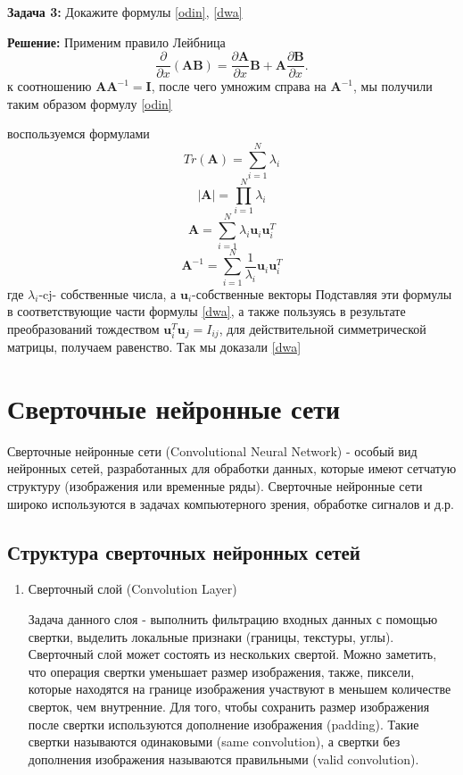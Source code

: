 {\textbf{Задача 3:}
Докажите формулы \ref{odin}, \ref{dwa} \

\textbf{Решение:}
Применим правило Лейбница
\[
\frac{\partial}{\partial x} (\mathbf{AB})=\frac{\partial \mathbf{A}}{\partial x}
 \mathbf{B}+\mathbf{A}\frac{\partial \mathbf{B}}{\partial x}.
\]
к соотношению $\mathbf{AA}^{-1}=\mathbf{I}$, после чего умножим справа на $\mathbf{A}^{-1}$, мы получили таким образом формулу \ref{odin}

воспользуемся формулами 
\[
Tr(\mathbf{A})=\displaystyle \sum_{i=1}^{N} \lambda_i
\]
\[
|\mathbf{A}|=\displaystyle \prod_{i=1}^{N} \lambda_i
\]
\[
\mathbf{A}=\displaystyle \sum_{i=1}^{N} \lambda_i \mathbf{u}_i\mathbf{u}_i^{T}
\]
\[
\mathbf{A}^{-1}=\displaystyle \sum_{i=1}^{N} \frac{1}{\lambda_i} \mathbf{u}_i\mathbf{u}_i^{T}
\]
где $\lambda_i$-cj- собственные числа, а $\mathbf{u}_i$-собственные векторы
Подставляя эти формулы в соответствующие части формулы \ref{dwa}, а также пользуясь в результате преобразований тождеством $\mathbf{u}_i^{T}\mathbf{u}_j=I_{ij}$, для действительной симметрической матрицы, получаем равенство. Так мы доказали \ref{dwa}


\section{Сверточные нейронные сети}
Сверточные нейронные сети (Convolutional Neural Network) - особый вид нейронных сетей, разработанных
для обработки данных, которые имеют сетчатую структуру (изображения или временные ряды). Сверточные
нейронные сети широко используются в задачах компьютерного зрения, обработке сигналов и д.р.

\subsection{Структура сверточных нейронных сетей}

\begin{enumerate}
\item Сверточный слой (Convolution Layer)

Задача данного слоя - выполнить фильтрацию входных данных с помощью свертки, выделить локальные
признаки (границы, текстуры, углы). Сверточный слой может состоять из нескольких свертой. Можно
заметить, что операция свертки уменьшает размер изображения, также, пиксели, которые находятся на
границе изображения участвуют в меньшем количестве сверток, чем внутренние. Для того, чтобы
сохранить размер изображения после свертки используются дополнение изображения (padding). Такие
свертки называются одинаковыми (same convolution), а свертки без дополнения изображения
называются правильными (valid convolution).


\end{enumerate}}

